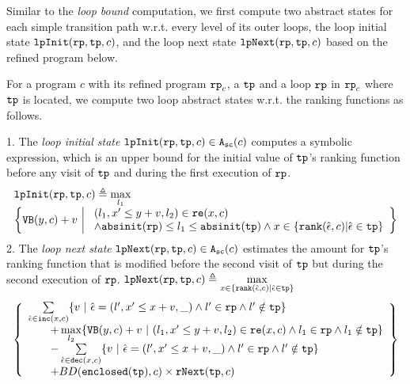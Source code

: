 Similar to the \emph{loop bound} computation,
we first compute two abstract states for each simple transition path w.r.t. every level of its outer loops,
the loop initial state $\mathtt{lpInit}(\mathtt{rp}, \mathtt{tp}, c)$, and the loop next state $\mathtt{lpNext}(\mathtt{rp}, \mathtt{tp}, c)$ based on the refined program below.
\begin{defn}
\label{def:alg-loopabsstate}
For a program $c$ with its refined program $\mathtt{rp}_c$, a $\mathtt{tp}$ and a loop $\mathtt{rp}$ in $\mathtt{rp}_c$ where $\mathtt{tp}$ is located, we compute
two loop abstract states
w.r.t. the ranking functions as follows.
 
1. The \emph{loop initial state} 
$\mathtt{lpInit}(\mathtt{rp}, \mathtt{tp}, c) \in {\ensuremath{\mathtt{A_{sc}}}}(c)$ computes a symbolic expression, which is an upper bound for the initial value of $\mathtt{tp}$'s ranking function before
any visit of $\mathtt{tp}$ and during the first execution of $\mathtt{rp}$.
\[
 \begin{array}{l}
 \lpinit(\rprog, \tpath, c) \triangleq 
 \max\limits_{l_1}
 \\
 \left\{
 \varinvar(y, c) + v ~\middle\vert~ 
 \begin{array}{l} 
 (l_1, x' \leq y + v, l_2) \in \reset(x, c) 
 \\
 \land \absinit(\rprog) \leq l_1 \leq \absinit(\tpath)
 \land
 x \in \left\{ \rank(\absevent, c) | \absevent \in \tpath \right\}
 \end{array}
 \right\}
 \end{array}
 \]
2.
The \emph{loop next state}
$\mathtt{lpNext}(\mathtt{rp}, \mathtt{tp}, c) \in {\ensuremath{\mathtt{A_{sc}}}}(c)$ 
estimates the amount for $\mathtt{tp}$'s ranking function
that is modified before
the second visit of $\mathtt{tp}$ but during the second execution of $\mathtt{rp}$.
$ 
\lpnext(\rprog, \tpath, c) \triangleq 
\max\limits_{x \in \left\{ \rank(\absevent, c) | \absevent \in \tpath \right\}}
$
%
{\small
\[
 \begin{array}{l}
 \left\{
 \begin{array}{l}
 \sum\limits_{\absevent \in \inc(x, c) }
 \left\{ 
 v ~\middle\vert~ \absevent = (l', x' \leq x + v, \_) \land l' \in \rprog 
 \land l' \notin \tpath \right\}
 \\ \qquad 
 + \max\limits_{l_2 }
 \left\{ \varinvar(y, c) + v ~\middle\vert~ 
 (l_1, x' \leq y + v, l_2) \in \reset(x, c) \land l_1 \in \rprog \land l_1 \notin \tpath\right\}
 \\ \qquad 
 - \sum\limits_{ \absevent \in \dec(x, c) }\left\{ 
 v 
 ~\middle\vert~ \absevent = (l', x' \leq x + v, \_) \land l' \in \rprog \land l' \notin \tpath \right\}
 \\ \qquad 
 + BD(\kw{enclosed}(\tpath), c) \times \rfnext(\tpath, c)
 \end{array}
 \right\}
 \end{array}
 \]
 }
\end{defn}
